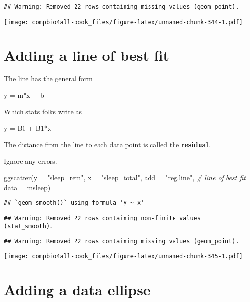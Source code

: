 \documentclass[
]{book}
\newenvironment{Shaded}{\begin{snugshade}}{\end{snugshade}}
\newcommand{\AttributeTok}[1]{\textcolor[rgb]{0.77,0.63,0.00}{#1}}
\newcommand{\CommentTok}[1]{\textcolor[rgb]{0.56,0.35,0.01}{\textit{#1}}}
\newcommand{\FunctionTok}[1]{\textcolor[rgb]{0.00,0.00,0.00}{#1}}
\newcommand{\NormalTok}[1]{#1}
\newcommand{\StringTok}[1]{\textcolor[rgb]{0.31,0.60,0.02}{#1}}
\begin{document}
\begin{verbatim}
## Warning: Removed 22 rows containing missing values (geom_point).
\end{verbatim}

\texttt{[image: compbio4all-book\_files/figure-latex/unnamed-chunk-344-1.pdf]}

\hypertarget{adding-a-line-of-best-fit}{%
\section{Adding a line of best fit}\label{adding-a-line-of-best-fit}}

The line has the general form

y = m*x + b

Which stats folks write as

y = B0 + B1*x

The distance from the line to each data point is called the \textbf{residual}.

Ignore any errors.

\begin{Shaded}
\begin{Highlighting}[]
\FunctionTok{ggscatter}\NormalTok{(}\AttributeTok{y =} \StringTok{"sleep\_rem"}\NormalTok{,}
          \AttributeTok{x =} \StringTok{"sleep\_total"}\NormalTok{,}
          \AttributeTok{add =} \StringTok{"reg.line"}\NormalTok{,  }\CommentTok{\# line of best fit}
          \AttributeTok{data =}\NormalTok{ msleep)}
\end{Highlighting}
\end{Shaded}

\begin{verbatim}
## `geom_smooth()` using formula 'y ~ x'
\end{verbatim}

\begin{verbatim}
## Warning: Removed 22 rows containing non-finite values (stat_smooth).
\end{verbatim}

\begin{verbatim}
## Warning: Removed 22 rows containing missing values (geom_point).
\end{verbatim}

\texttt{[image: compbio4all-book\_files/figure-latex/unnamed-chunk-345-1.pdf]}

\hypertarget{adding-a-data-ellipse}{%
\section{Adding a data ellipse}\label{adding-a-data-ellipse}}
\end{document}
